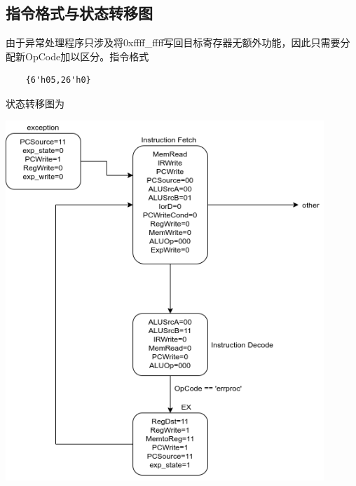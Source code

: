 \documentclass{article}
\begin{document}
\subsection{指令格式与状态转移图}
由于异常处理程序只涉及将0xffff\_ffff写回目标寄存器无额外功能，因此只需要分配新OpCode加以区分。指令格式
\begin{lstlisting}
    {6'h05,26'h0}
\end{lstlisting}
状态转移图为
\begin{center}
    \includegraphics[width = 12cm]{images/exception_fsm.png}
\end{center}
\end{document}

